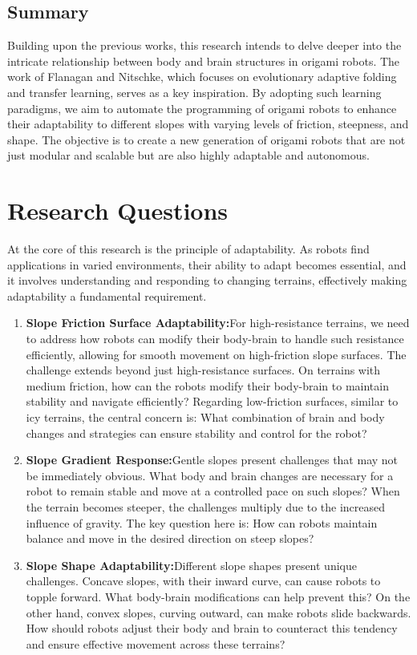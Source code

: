 \documentclass{sigchi}
\begin{document}
\subsection{Summary}
Building upon the previous works, this research intends to delve deeper into the intricate relationship between body and brain structures in origami robots. The work of Flanagan and Nitschke, which focuses on  evolutionary adaptive folding and transfer learning, serves as a key inspiration\cite{flanagan_evolving_2023}. By adopting such learning paradigms, we aim to automate the programming of origami robots to enhance their adaptability to different slopes with varying levels of friction, steepness, and shape. The objective is to create a new generation of origami robots that are not just modular and scalable but are also highly adaptable and autonomous.



\section{Research Questions}
At the core of this research is the principle of adaptability. As robots find applications in varied environments, their ability to adapt becomes essential, and it involves understanding and responding to changing terrains, effectively making adaptability a fundamental requirement.

\begin{enumerate}
    \item \textbf{Slope Friction Surface Adaptability:}For high-resistance terrains, we need to address how robots can modify their body-brain to handle such resistance efficiently, allowing for smooth movement on high-friction slope surfaces. The challenge extends beyond just high-resistance surfaces. On terrains with medium friction, how can the robots modify their body-brain to maintain stability and navigate efficiently? Regarding low-friction surfaces, similar to icy terrains, the central concern is: What combination of brain and body changes and strategies can ensure stability and control for the robot? \label{q:first}
    \item \textbf{Slope Gradient Response:}Gentle slopes present challenges that may not be immediately obvious. What body and brain changes are necessary for a robot to remain stable and move at a controlled pace on such slopes? When the terrain becomes steeper, the challenges multiply due to the increased influence of gravity. The key question here is: How can robots maintain balance and move in the desired direction on steep slopes?\label{q:second}
    \item \textbf{Slope Shape Adaptability:}Different slope shapes present unique challenges. Concave slopes, with their inward curve, can cause robots to topple forward. What body-brain modifications can help prevent this? On the other hand, convex slopes, curving outward, can make robots slide backwards. How should robots adjust their body and brain to counteract this tendency and ensure effective movement across these terrains?\label{q:third}

\end{enumerate}
\end{document}

